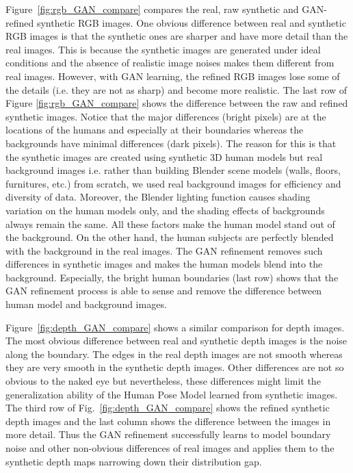 \documentclass[twocolumn]{svjour3}          \smartqed  \usepackage{graphicx}
\begin{document}
Figure~\ref{fig:rgb_GAN_compare} compares the real, raw synthetic and GAN-refined synthetic RGB images. One obvious difference between real and synthetic RGB images is that the synthetic ones are sharper and have more detail than the real images. This is because the synthetic images are generated under ideal conditions and the absence of realistic image noises makes them different from real images. However, with GAN learning, the refined RGB images lose some of the details (i.e. they are not as sharp) and become more realistic. The last row of Figure \ref{fig:rgb_GAN_compare} shows the difference between the raw and refined synthetic images. Notice that the major differences (bright pixels) are at the locations of the humans and especially at their boundaries whereas the backgrounds have minimal differences (dark pixels). The reason for this is that the synthetic images are created using synthetic 3D human models but real background images i.e. rather than building Blender scene models (walls, floors, furnitures, etc.) from scratch, we used real background images for efficiency and diversity of data. Moreover, the Blender lighting function causes shading variation on the human models only, and the shading effects of backgrounds always remain the same. All these factors make the human model stand out of the background. On the other hand, the human subjects are perfectly blended with the background in the real images. The GAN refinement removes such differences in synthetic images and makes the human models blend into the background. Especially, the bright human boundaries (last row) shows that the GAN refinement process is able to sense and remove the difference between human model and background images.

Figure~\ref{fig:depth_GAN_compare} shows a similar comparison for depth images. The most obvious difference between real and synthetic depth images is the noise along the boundary. The edges in the real depth images are not smooth whereas they are very smooth in the synthetic depth images. Other differences are not so obvious to the naked eye but nevertheless, these differences might limit the generalization ability of the Human Pose Model learned from synthetic images. The third row of Fig.~\ref{fig:depth_GAN_compare} shows the refined synthetic depth images and the last column shows the difference between the images in more detail. Thus the GAN refinement successfully learns to model boundary noise and other non-obvious differences of real images and applies them to the synthetic depth maps narrowing down their distribution gap.
\end{document}
